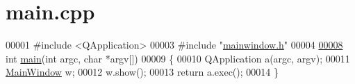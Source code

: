 \hypertarget{a00014_source}{}\section{main.\+cpp}

\begin{DoxyCode}
00001 \textcolor{preprocessor}{#include <QApplication>}
00003 \textcolor{preprocessor}{#include "\hyperlink{a00016}{mainwindow.h}"}
00004 
\hypertarget{a00014_source_l00008}{}\hyperlink{a00014_a0ddf1224851353fc92bfbff6f499fa97}{00008} \textcolor{keywordtype}{int} \hyperlink{a00014_a0ddf1224851353fc92bfbff6f499fa97}{main}(\textcolor{keywordtype}{int} argc, \textcolor{keywordtype}{char} *argv[])
00009 \{
00010     QApplication a(argc, argv);
00011     \hyperlink{a00004}{MainWindow} w;
00012     w.show();
00013     \textcolor{keywordflow}{return} a.exec();
00014 \}
\end{DoxyCode}
